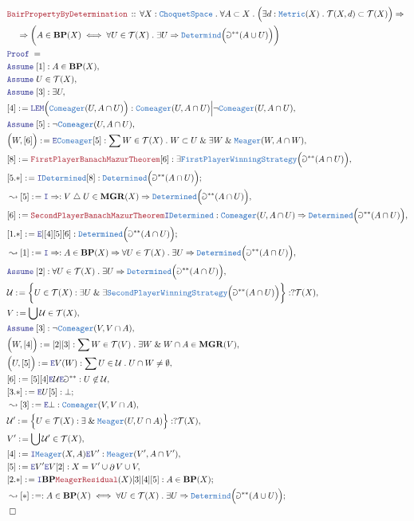 \documentclass[12pt]{scrartcl}
\newcommand{\TYPE}[1]{\textcolor{NavyBlue}{\mathtt{#1}}}
\newcommand{\LOGIC}[1]{\textcolor{Blue}{\mathtt{#1}}}
\newcommand{\THM}[1]{\textcolor{Maroon}{\mathtt{#1}}}
\renewcommand{\.}{\; . \;}
\newcommand{\de}{: \kern 0.1pc =}
\newcommand{\Theorem}[2]{& \THM{#1} \, :: \, #2 \\ & \Proof = \\ }
\newcommand{\NewLine}{\\ & \kern 1pc}
\newcommand{\Page}[1]{ \begin{align*} #1 \end{align*}   }
\renewcommand{\And}{\; \& \;}
\newcommand{\Imply}{\Rightarrow}
\newcommand{\Intro}{\LOGIC{I}}
\newcommand{\Elim}{\LOGIC{E}}
\newcommand{\du}{\; \triangle \;}
\newcommand{\Say}[3]{& #1 \de #2 : #3, \\}
\newcommand{\SayIn}[3]{& #1 \de #2 \in #3, \\}
\newcommand{\Conclude}[3]{& #1 \de #2 : #3; \\}
\newcommand{\Derive}[3]{& \leadsto #1 \de #2 : #3, \\}
\newcommand{\DeriveConclude}[3]{& \leadsto #1 \de #2 : #3 ; \\}
\newcommand{\Assume}[2]{& \LOGIC{Assume} \; #1 : #2, \\}
\newcommand{\AssumeIn}[2]{& \LOGIC{Assume} \; #1 \in #2, \\}
\newcommand{\QED}{\; \square}
\newcommand{\EndProof}{& \QED \\}
\newcommand{\Proof}{\LOGIC{Proof} \; }
\newcommand{\Meager}{\TYPE{Meager}}
\newcommand{\Comeager}{\TYPE{Comeager}}
\DeclareMathOperator*{\boundary}{\partial}
\newcommand{\T}{\mathcal{T}}
\newcommand{\U}{\mathcal{U}}
\newcommand{\FPWS}{\TYPE{FirstPlayerWinningStrategy}}
\newcommand{\SPWS}{\TYPE{SecondPlayerWinningStrategy}}
\newcommand{\CS}{\TYPE{ChoquetSpace}}
\newcommand{\BP}{\mathbf{BP}}
\newcommand{\MGR}{\mathbf{MGR}}
\begin{document}
\Page{
	\Theorem{BairPropertyByDetermination}
	{
		\forall X : \CS \.
		\forall A \subset X \.
		\Big( \exists d : \TYPE{Metric}(X) \. 
		\T(X,d) \subset \T(X) \Big)
		\Imply \NewLine \Imply
		\bigg(
			A \in \BP(X) \iff
			\forall U \in \T(X) \.
			\exists U \Imply
			\TYPE{Determind}\Big(\Game^{**}(A \cup U)\Big)
		\bigg)
	}
	\Assume{[1]}{A \in \BP(X)}
	\AssumeIn{U}{\T(X)}
	\Assume{[3]}{\exists U}
	\Say{[4]}{\LOGIC{LEM}\Big(\TYPE{Comeager}(U,A \cap U) \Big)}
	{
		\TYPE{Comeager}(U,A \cap U)
		\Big|
		\neg \TYPE{Comeager}(U,A \cap U)
	}	
	\Assume{[5]}{\neg \TYPE{Comeager}(U,A \cap U)}
	\Say{\Big(W, [6]\Big)}{\Elim \TYPE{Comeager}[5]}
	{ 
		\sum W \in \T(X) \. W \subset U \And \exists W \And \Meager(W,A \cap W) 
	}
	\Say{[8]}{\THM{FirstPlayerBanachMazurTheorem}[6]}
	{
		\exists \FPWS\Big( \Game^{**}(A \cap U) \Big)
	}
	\Conclude{[5.*]}{\Intro \TYPE{Determined}[8]}
	{
		\TYPE{Determined}
		\Big(
				\Game^{**}(A \cap U)
		\Big)
	}
	\Derive{[5]}{\Intro \Imply}
	{
		V \du U \in \MGR(X)
		\Imply
		\TYPE{Determined}
		\Big(
				\Game^{**}(A \cap U)
		\Big)
	}
	\Say{[6]}{\THM{SecondPlayerBanachMazurTheorem} \Intro \TYPE{Determined}}
	{
			\TYPE{Comeager}(U,A \cap U) \Imply
			\TYPE{Determined}
			\Big(
				\Game^{**}(A \cap U)
			\Big)
	}
	\Conclude{[1.*]}{\Elim | [4][5][6]}
	{
		\TYPE{Determined}
		\Big(
				\Game^{**}(A \cap U)
		\Big)
	}
	\Derive{[1]}{\Intro \Imply}
	{
			A \in \BP(X) \Imply
			\forall U \in \T(X) \.
			\exists U \Imply
			\TYPE{Determined}\Big(\Game^{**}(A \cap U)\Big)
	}
	\Assume{[2]}
	{
		\forall U \in \T(X) \.
		\exists U \Imply
		\TYPE{Determined}\Big(\Game^{**}(A \cap U)\Big)
	}
	\Say{\U}
	{
		\bigg\{
			U \in \T(X) : \exists U \And \exists \SPWS\Big( \Game^{**}(A \cap U)\Big)
		\bigg\}
	}
	{
		?\T(X)
	}
	\SayIn{V}{\bigcup \U}{\T(X)}
	\Assume{[3]}{\neg \Comeager(V,V\cap A)}
	\Say{\Big(W,[4]\Big)}{[2][3]}
	{
		\sum W \in \T(V) \. \exists W \And W \cap A \in \MGR(V)
	}
	\Say{\Big( U,[5]\Big)}{\Elim V(W)}{\sum U \in \U \. U \cap W \neq \emptyset}
	\Say{[6]}{[5][4]\Elim \U \Elim \Game^{**}}
	{
		U \not \in \U	
	}
	\Conclude{[3.*]}{\Elim U [5]}{\bot}
	\Derive{[3]}{\Elim \bot}{\Comeager(V,V\cap A)}
	\Say{\U'}
	{
		\Big\{ U \in \T(X) : \exists \And \Meager(U,U\cap A)    \Big\}
	}
	{
		?\T(X)
	}
	\SayIn{V'}{\bigcup \U'}{\T(X)}
	\Say{[4]}{\Intro \TYPE{Meager}(X,A)\Elim V'}
	{
		\Meager(V',A \cap V')
	}
	\Say{[5]}{\Elim V' \Elim V [2]}
	{
		X = V' \cup \boundary V \cup V
	}
	\Conclude{[2.*]}{\Intro \BP \THM{MeagerResidual}(X)[3][4][5]}
	{
		A \in \BP(X)
	}
	\DeriveConclude{[*]}{}
	{
		A \in \BP(X) \iff
		\forall U \in \T(X) \.
		\exists U \Imply
		\TYPE{Determind}\Big(\Game^{**}(A \cup U)\Big)
	}
	\EndProof
}
\end{document}
